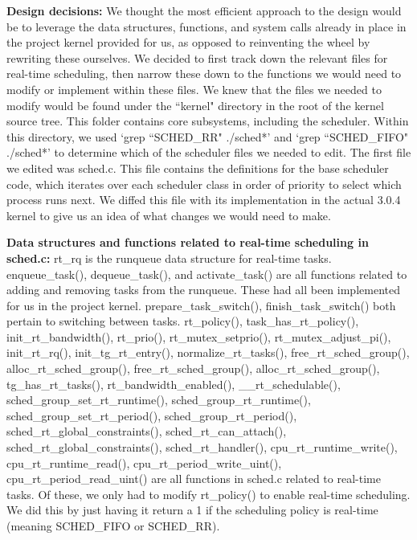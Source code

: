 \documentclass[letterpaper,10pt,titlepage]{article}
\newcommand{\ignore}[2]{\hspace{0in}#2} %
\newcommand{\tab}{\hspace*{2em}} %
\begin{document}
\begin{enumerate}
\tab \textbf{Design decisions:} We thought the most efficient approach to the design would be to leverage the data structures, functions, and system calls already in place in the project kernel provided for us, as opposed to reinventing the wheel by rewriting these ourselves. We decided to first track down the relevant files for real-time scheduling, then narrow these down to the functions we would need to modify or implement within these files. We knew that the files we needed to modify would be found under the ``kernel" directory in the root of the kernel source tree. This folder contains core subsystems, including the scheduler. Within this directory, we used `grep ``SCHED\_RR" ./sched*' and `grep ``SCHED\_FIFO" ./sched*' to determine which of the scheduler files we needed to edit. The first file we edited was sched.c. This file contains the definitions for the base scheduler code, which iterates over each scheduler class in order of priority to select which process runs next\ignore{[Linux Kernel Development, pg. 47]}. We diffed this file with its implementation in the actual 3.0.4 kernel to give us an idea of what changes we would need to make.

\tab \textbf{Data structures and functions related to real-time scheduling in sched.c:} rt\_rq is the runqueue data structure for real-time tasks. enqueue\_task(), dequeue\_task(), and activate\_task() are all functions related to adding and removing tasks from the runqueue. These had all been implemented for us in the project kernel. prepare\_task\_switch(), finish\_task\_switch() both pertain to switching between tasks. rt\_policy(), task\_has\_rt\_policy(), init\_rt\_bandwidth(), rt\_prio(), 
\newline
rt\_mutex\_setprio(), rt\_mutex\_adjust\_pi(), init\_rt\_rq(), init\_tg\_rt\_entry(), normalize\_rt\_tasks(), free\_rt\_sched\_group(), alloc\_rt\_sched\_group(), free\_rt\_sched\_group(), alloc\_rt\_sched\_group(), tg\_has\_rt\_tasks(), rt\_bandwidth\_enabled(), 
\newline
\_\_rt\_schedulable(), sched\_group\_set\_rt\_runtime(), sched\_group\_rt\_runtime(), sched\_group\_set\_rt\_period(), 
\newline
sched\_group\_rt\_period(), sched\_rt\_global\_constraints(), sched\_rt\_can\_attach(), sched\_rt\_global\_constraints(), 
\newline
sched\_rt\_handler(), cpu\_rt\_runtime\_write(), cpu\_rt\_runtime\_read(), cpu\_rt\_period\_write\_uint(), cpu\_rt\_period\_read\_uint() are all functions in sched.c related to real-time tasks. Of these, we only had to modify rt\_policy() to enable real-time scheduling. We did this by just having it return a 1 if the scheduling policy is real-time (meaning SCHED\_FIFO or SCHED\_RR).


\end{enumerate}
\end{document}
